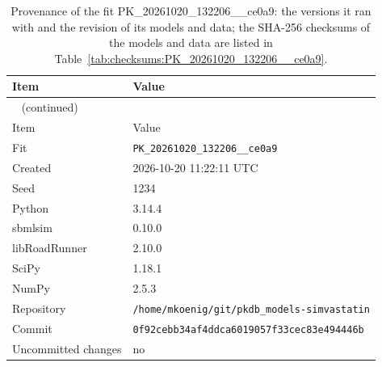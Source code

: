 \documentclass{article}
\begin{document}
\begin{longtable}{ll}
\caption{Provenance of the fit PK\_20261020\_132206\_\_ce0a9: the versions it ran with and the revision of its models and data; the SHA-256 checksums of the models and data are listed in Table~\ref{tab:checksums:PK_20261020_132206__ce0a9}.}\label{tab:provenance:PK_20261020_132206__ce0a9} \\
\toprule
Item & Value \\
\midrule
\endfirsthead
\multicolumn{2}{l}{\small\tablename~\thetable{} (continued)} \\
\toprule
Item & Value \\
\midrule
\endhead
\bottomrule
\endlastfoot
Fit & \texttt{PK\_20261020\_132206\_\_ce0a9} \\
Created & 2026-10-20 11:22:11 UTC \\
Seed & 1234 \\
Python & 3.14.4 \\
sbmlsim & 0.10.0 \\
libRoadRunner & 2.10.0 \\
SciPy & 1.18.1 \\
NumPy & 2.5.3 \\
Repository & \texttt{/home/mkoenig/git/pkdb\_models-simvastatin} \\
Commit & \texttt{0f92cebb34af4ddca6019057f33cec83e494446b} \\
Uncommitted changes & no \\
\end{longtable}



\end{document}
